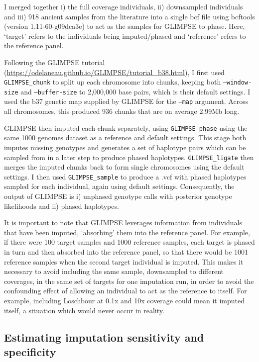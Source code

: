 {I merged together i) the full coverage individuals, ii) downsampled individuals and iii) 918 ancient samples from the literature into a single bcf file using bcftools (version 1.11-60-g09dca3e) \cite{li2011statistical} to act as the samples for GLIMPSE to phase. Here, `target' refers to the individuals being imputed/phased and `reference' refers to the reference panel.  

Following the GLIMPSE tutorial (\url{https://odelaneau.github.io/GLIMPSE/tutorial_b38.html}), I first used \texttt{GLIMPSE\_chunk} to split up each  chromosome into chunks, keeping both \texttt{--window-size} and \texttt{--buffer-size} to 2,000,000 base pairs, which is their default settings. I used the b37 genetic map supplied by GLIMPSE for the \texttt{--map} argument. Across all chromosomes, this produced 936 chunks that are on average 2.99Mb long. 

GLIMPSE then imputed each chunk separately, using \texttt{GLIMPSE\_phase} using the same 1000 genomes dataset as a reference and default settings. This stage both imputes missing genotypes and generates a set of haplotype pairs which can be sampled from in a later step to produce phased haplotypes. \texttt{GLIMPSE\_ligate} then merges the imputed chunks back to form single chromosomes using the default settings. I then used \texttt{GLIMPSE\_sample} to produce a .vcf with phased haplotypes sampled for each individual, again using default settings. Consequently, the output of GLIMPSE is i) unphased genotype calls with posterior genotype likelihoods and ii) phased haplotypes.

It is important to note that GLIMPSE leverages information from individuals that have been imputed, `absorbing' them into the reference panel. For example, if there were 100 target samples and 1000 reference samples, each target is phased in turn and then absorbed into the reference panel, so that there would be 1001 reference samples when the second target individual is imputed. This makes it necessary to avoid including the same sample, downsampled to different coverages, in the same set of targets for one imputation run, in order to avoid the confounding effect of allowing an individual to act as the reference to itself. For example, including Loschbour at 0.1x and 10x coverage could mean it imputed itself, a situation which would never occur in reality. 


\subsection{Estimating imputation sensitivity and specificity}

}
